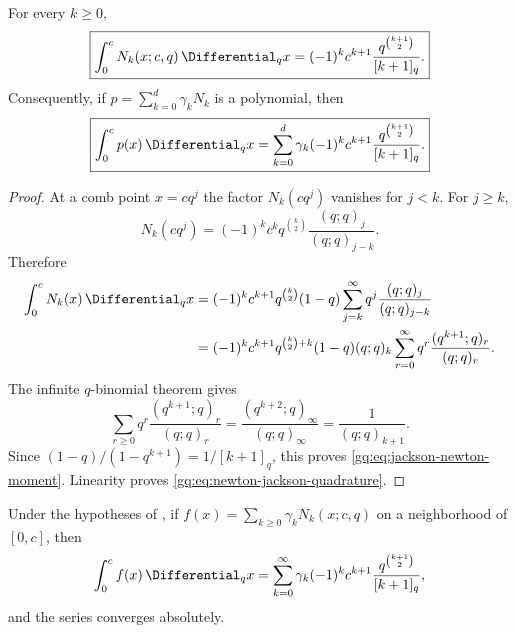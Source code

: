 \begin{theorem}
\label{gq:thm:jackson-newton-moments}
For every $k\ge0$,
\begin{equation}
 \boxed{
 \int_0^c N_k(x;c,q)\,\Differential_qx
 =(-1)^k c^{k+1}
   \frac{q^{\binom{k+1}{2}}}{[k+1]_q}.}
 \label{gq:eq:jackson-newton-moment}
\end{equation}
Consequently, if $p=\sum_{k=0}^d\gamma_kN_k$ is a polynomial, then
\begin{equation}
 \boxed{
 \int_0^c p(x)\,\Differential_qx
 =\sum_{k=0}^d\gamma_k(-1)^kc^{k+1}
   \frac{q^{\binom{k+1}{2}}}{[k+1]_q}.}
 \label{gq:eq:newton-jackson-quadrature}
\end{equation}
\end{theorem}

\begin{proof}
At a comb point $x=cq^j$ the factor $N_k(cq^j)$ vanishes for $j<k$.
For $j\ge k$,
\begin{equation}
 N_k(cq^j)
 =(-1)^kc^kq^{\binom k2}
   \frac{(q;q)_j}{(q;q)_{j-k}}.
 \label{gq:eq:newton-at-tail-node}
\end{equation}
Therefore
\begin{align*}
 \int_0^cN_k(x)\,\Differential_qx
 &=(-1)^kc^{k+1}q^{\binom k2}(1-q)
   \sum_{j=k}^{\infty}q^j\frac{(q;q)_j}{(q;q)_{j-k}}\\
 &=(-1)^kc^{k+1}q^{\binom k2+k}(1-q)(q;q)_k
   \sum_{r=0}^{\infty}q^r\frac{(q^{k+1};q)_r}{(q;q)_r}.
\end{align*}
The infinite $q$-binomial theorem gives
\[
 \sum_{r\ge0}q^r\frac{(q^{k+1};q)_r}{(q;q)_r}
 =\frac{(q^{k+2};q)_\infty}{(q;q)_\infty}
 =\frac1{(q;q)_{k+1}}.
\]
Since $(1-q)/(1-q^{k+1})=1/[k+1]_q$, this proves
\eqref{gq:eq:jackson-newton-moment}.  Linearity proves
\eqref{gq:eq:newton-jackson-quadrature}.
\end{proof}

\begin{corollary}
\label{gq:cor:analytic-newton-jackson}
Under the hypotheses of , if
$f(x)=\sum_{k\ge0}\gamma_kN_k(x;c,q)$ on a neighborhood of $[0,c]$, then
\begin{equation}
 \int_0^c f(x)\,\Differential_qx
 =\sum_{k=0}^{\infty}\gamma_k(-1)^kc^{k+1}
   \frac{q^{\binom{k+1}{2}}}{[k+1]_q},
 \label{gq:eq:analytic-newton-jackson}
\end{equation}
and the series converges absolutely.
\end{corollary}

